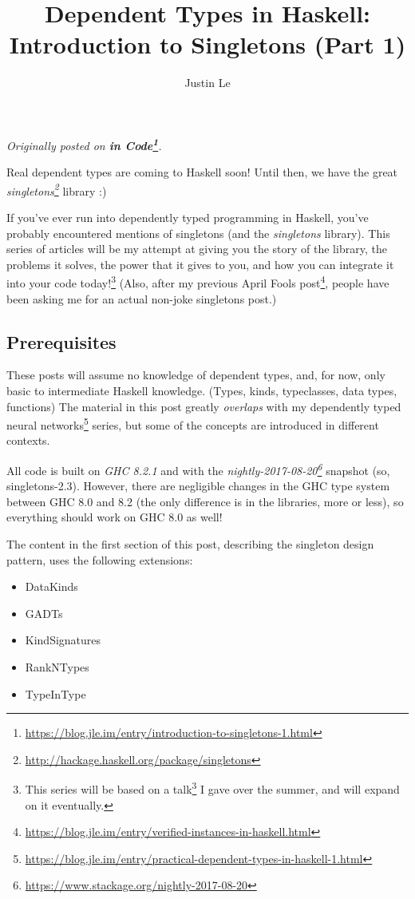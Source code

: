 \documentclass[]{article}
\title{Dependent Types in Haskell: Introduction to Singletons (Part 1)}
\author{Justin Le}
\renewcommand{\href}[2]{#2\footnote{\url{#1}}}
\begin{document}
\maketitle

\emph{Originally posted on
\textbf{\href{https://blog.jle.im/entry/introduction-to-singletons-1.html}{in
Code}}.}

Real dependent types are coming to Haskell soon! Until then, we have the great
\emph{\href{http://hackage.haskell.org/package/singletons}{singletons}} library
:)

If you've ever run into dependently typed programming in Haskell, you've
probably encountered mentions of singletons (and the \emph{singletons} library).
This series of articles will be my attempt at giving you the story of the
library, the problems it solves, the power that it gives to you, and how you can
integrate it into your code today!\footnote{This series will be based on
  \href{http://talks.jle.im/lambdaconf-2017/singletons/}{a talk} I gave over the
  summer, and will expand on it eventually.} (Also, after
\href{https://blog.jle.im/entry/verified-instances-in-haskell.html}{my previous
April Fools post}, people have been asking me for an actual non-joke singletons
post.)

\subsection{Prerequisites}\label{prerequisites}

These posts will assume no knowledge of dependent types, and, for now, only
basic to intermediate Haskell knowledge. (Types, kinds, typeclasses, data types,
functions) The material in this post greatly \emph{overlaps} with my
\href{https://blog.jle.im/entry/practical-dependent-types-in-haskell-1.html}{dependently
typed neural networks} series, but some of the concepts are introduced in
different contexts.

All code is built on \emph{GHC 8.2.1} and with the
\emph{\href{https://www.stackage.org/nightly-2017-08-20}{nightly-2017-08-20}}
snapshot (so, singletons-2.3). However, there are negligible changes in the GHC
type system between GHC 8.0 and 8.2 (the only difference is in the libraries,
more or less), so everything should work on GHC 8.0 as well!

The content in the first section of this post, describing the singleton design
pattern, uses the following extensions:

\begin{itemize}
\tightlist
\item
  DataKinds
\item
  GADTs
\item
  KindSignatures
\item
  RankNTypes
\item
  TypeInType
\end{itemize}
\end{document}
